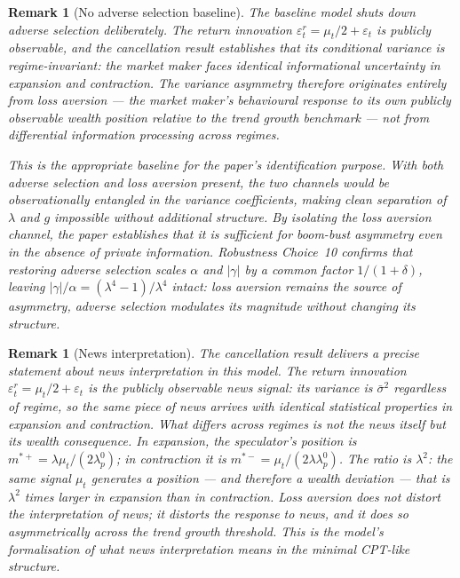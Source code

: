 \documentclass[12pt,a4paper]{article}
\newtheorem{remark}[theorem]{Remark}
\theoremstyle{definition}
\begin{document}
\begin{remark}[No adverse selection baseline]
\label{rem:no_adv_sel}
The baseline model shuts down adverse selection deliberately. The return
innovation $\varepsilon^r_t = \mu_t/2 + \varepsilon_t$ is publicly
observable, and the cancellation result establishes that its conditional
variance is regime-invariant: the market maker faces identical
informational uncertainty in expansion and contraction. The variance
asymmetry therefore originates entirely from loss aversion --- the market
maker's behavioural response to its own publicly observable wealth
position relative to the trend growth benchmark --- not from differential
information processing across regimes.

This is the appropriate baseline for the paper's identification purpose.
With both adverse selection and loss aversion present, the two channels
would be observationally entangled in the variance coefficients, making
clean separation of $\lambda$ and $g$ impossible without additional
structure. By isolating the loss aversion channel, the paper establishes
that it is sufficient for boom-bust asymmetry even in the absence of
private information. Robustness Choice~10 confirms that restoring adverse
selection scales $\alpha$ and $|\gamma|$ by a common factor $1/(1+\delta)$,
leaving $|\gamma|/\alpha = (\lambda^4-1)/\lambda^4$ intact: loss aversion
remains the source of asymmetry, adverse selection modulates its magnitude
without changing its structure.
\end{remark}

\begin{remark}[News interpretation]
\label{rem:news}
The cancellation result delivers a precise statement about news
interpretation in this model. The return innovation $\varepsilon^r_t =
\mu_t/2 + \varepsilon_t$ is the publicly observable news signal: its
variance is $\bar\sigma^2$ regardless of regime, so the same piece of
news arrives with identical statistical properties in expansion and
contraction. What differs across regimes is not the news itself but its
\emph{wealth consequence}. In expansion, the speculator's position is
$m^{*+} = \lambda\mu_t/(2\lambda^0_p)$; in contraction it is
$m^{*-} = \mu_t/(2\lambda\lambda^0_p)$. The ratio is $\lambda^2$: the
same signal $\mu_t$ generates a position --- and therefore a wealth
deviation --- that is $\lambda^2$ times larger in expansion than in
contraction. Loss aversion does not distort the interpretation of news;
it distorts the \emph{response} to news, and it does so asymmetrically
across the trend growth threshold. This is the model's formalisation of
what news interpretation means in the minimal CPT-like structure.
\end{remark}
\end{document}
